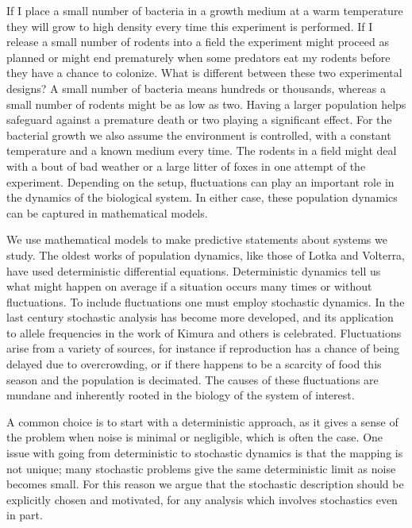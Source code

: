 If I place a small number of bacteria in a growth medium at a warm temperature they will grow to high density every time this experiment is performed. %
If I release a small number of rodents into a field the experiment might proceed as planned or might end prematurely when some predators eat my rodents before they have a chance to colonize. %
What is different between these two experimental designs? 
A small number of bacteria means hundreds or thousands, whereas a small number of rodents might be as low as two. 
Having a larger population helps safeguard against a premature death or two playing a significant effect. 
For the bacterial growth we also assume the environment is controlled, with a constant temperature and a known medium every time. 
The rodents in a field might deal with a bout of bad weather or a large litter of foxes in one attempt of the experiment. 
Depending on the setup, fluctuations can play an important role in the dynamics of the biological system. 
In either case, these population dynamics can be captured in mathematical models. 
\fi

We use mathematical models to make predictive statements about systems we study. 
The oldest works of population dynamics, like those of Lotka and Volterra, have used deterministic differential equations. %
Deterministic dynamics tell us what might happen on average if a situation occurs many times or without fluctuations. 
To include fluctuations one must employ stochastic dynamics. %
In the last century stochastic analysis has become more developed, and its application to allele frequencies in the work of Kimura and others is celebrated. %
Fluctuations arise from a variety of sources, for instance if reproduction has a chance of being delayed due to overcrowding, or if there happens to be a scarcity of food this season and the population is decimated. %
The causes of these fluctuations are mundane and inherently rooted in the biology of the system of interest. 

A common choice is to start with a deterministic approach, as it gives a sense of the problem when noise is minimal or negligible, which is often the case. 
One issue with going from deterministic to stochastic dynamics is that the mapping is not unique; many stochastic problems give the same deterministic limit as noise becomes small. 
For this reason we argue that the stochastic description should be explicitly chosen and motivated, for any analysis which involves stochastics even in part. 

